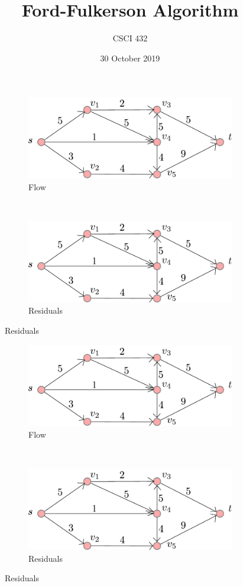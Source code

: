 \documentclass{article}
\title{Ford-Fulkerson Algorithm}
\author{CSCI 432}
\date{30 October 2019}
\begin{document}
\begin{figure}
    \centering
    \begin{subfigure}[b]{.45\textwidth}
        \includegraphics[width=\textwidth]{../figs/graph}\caption*{Flow}
    \end{subfigure}
    ~~
    \begin{subfigure}[b]{.45\textwidth}
        \includegraphics[width=\textwidth]{../figs/graph}\caption*{Residuals}
    \end{subfigure}
\end{figure}

\begin{figure}
    \centering
    \begin{subfigure}[b]{.45\textwidth}
        \includegraphics[width=\textwidth]{../figs/graph}\caption*{Flow}
    \end{subfigure}
    ~~
    \begin{subfigure}[b]{.45\textwidth}
        \includegraphics[width=\textwidth]{../figs/graph}\caption*{Residuals}
    \end{subfigure}
\end{figure}
\end{document}
